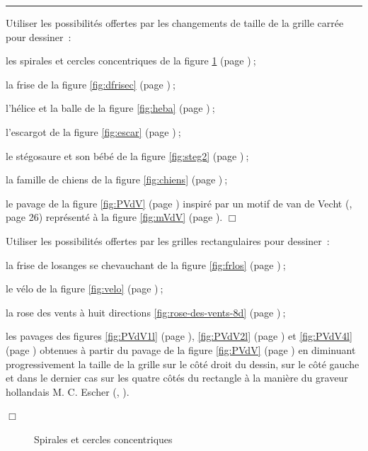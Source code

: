 \noindent \rule{137mm}{0.1mm} %
\begin{exercices}{Utiliser les possibilités offertes par les changements de taille de la grille carrée
pour dessiner~:

\tiret les spirales et cercles concentriques de la figure \ref{fig:spirales} (page \pageref{fig:spirales})$\:$;

\tiret la frise de la figure \ref{fig:dfrisec} (page \pageref{fig:dfrisec})$\:$;

\tiret l'hélice et la balle de la figure \ref{fig:heba} (page \pageref{fig:heba})$\:$;

\tiret l'escargot de la figure \ref{fig:escar} (page \pageref{fig:escar})$\:$;

\tiret le stégosaure et son bébé de la figure \ref{fig:steg2} (page \pageref{fig:steg2})$\:$;

\tiret la famille de chiens de la figure \ref{fig:chiens} (page \pageref{fig:chiens})$\:$;

\tiret le pavage de la figure \ref{fig:PVdV} (page \pageref{fig:PVdV}) inspiré par un motif de
van de Vecht (\cite{escher1}, page 26) représenté à la figure \ref{fig:mVdV} (page \pageref{fig:mVdV}).
\noindent $\Box$}\end{exercices}
\begin{exercices}{Utiliser les possibilités offertes par les  grilles rectangulaires
pour dessiner~:

\tiret la frise de losanges se chevauchant de la figure \ref{fig:frlos} (page \pageref{fig:frlos})$\:$;

\tiret le vélo de la figure \ref{fig:velo} (page \pageref{fig:velo})$\:$;

\tiret la rose des vents
à huit directions \ref{fig:rose-des-vents-8d} (page \pageref{fig:rose-des-vents-8d})$\:$;

\tiret les pavages des figures \ref{fig:PVdV1l} (page \pageref{fig:PVdV1l}),
\ref{fig:PVdV2l} (page \pageref{fig:PVdV2l}) et \ref{fig:PVdV4l} (page \pageref{fig:PVdV4l}) obtenues à
partir du pavage de la figure \ref{fig:PVdV} (page \pageref{fig:PVdV}) en diminuant pro\-gres\-si\-ve\-ment la taille de la grille sur le côté droit
du dessin, sur le côté gauche et dans le dernier cas sur les quatre côtés du rectangle à la manière du graveur
hollandais M. C. Escher (\cite{escher1}, \cite{escher2}).

\noindent $\Box$}\end{exercices}
\begin{figure}[htbp]
 \caption{Spirales et cercles concentriques}
 \label{fig:spirales}
\end{figure}
